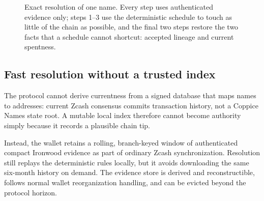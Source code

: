 \documentclass[11pt]{article}
\newcommand{\operation}[1]{\texttt{#1}}
\newcommand{\code}[1]{\texttt{#1}}
\begin{document}
\begin{figure}[ht]
\centering
{}
\caption{Exact resolution of one name. Every step uses authenticated
evidence only; steps 1--3 use the deterministic schedule to touch as little
of the chain as possible, and the final two steps restore the two facts that
a schedule cannot shortcut: accepted lineage and current spentness.}
\label{fig:resolution}
\end{figure}

\subsection{Fast resolution without a trusted index}
\label{sec:fastresolution}

The protocol cannot derive currentness from a signed database that maps names
to addresses: current Zcash consensus commits transaction history, not a
Coppice Names state root. A mutable local index therefore cannot become
authority simply because it records a plausible chain tip.

Instead, the wallet retains a rolling, branch-keyed window of authenticated
compact Ironwood evidence as part of ordinary Zcash synchronization.
Resolution still replays the deterministic rules locally, but it avoids
downloading the same six-month history on demand. The evidence store is
derived and reconstructible, follows normal wallet reorganization handling,
and can be evicted beyond the protocol horizon.
\end{document}
